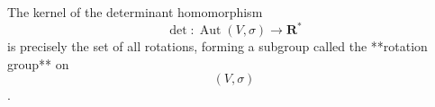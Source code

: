 The kernel of the determinant homomorphism $$\det: \operatorname{Aut}(V, \sigma) \to \mathbf{R}^*$$ is precisely the set of all rotations, forming a subgroup called the **rotation group** on $$(V, \sigma)$$.
